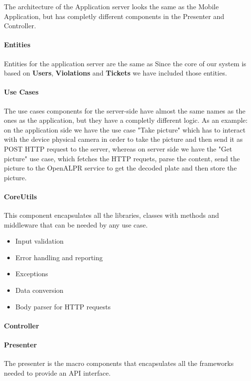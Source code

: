 The architecture of the Application server looks the same as the Mobile Application, but has completly different components in the Presenter and Controller.


\paragraph{Entities}
Entities for the application server are the same as
Since the core of our system is based on \textbf{Users}, \textbf{Violations} and \textbf{Tickets} we have included those entities.


\paragraph{Use Cases}
The use cases components for the server-side have almost the same names as the ones as the application, but they have a completly different logic.
As an example: on the application side we have the use case "Take picture" which has to interact with the device physical camera in order to take the picture and then send it as POST HTTP request to the server, whereas on server side we have the "Get picture" use case, which fetches the HTTP requets, parse the content, send the picture to the OpenALPR service to get the decoded plate and then store the picture.



\paragraph{CoreUtils}
This component encapsulates all the libraries, classes with methods and middleware that can be needed by any use case.
\begin{itemize}
  \item Input validation
  \item Error handling and reporting
  \item Exceptions
  \item Data conversion
  \item Body parser for HTTP requests
\end{itemize}



\paragraph{Controller}


\paragraph{Presenter}
The presenter is the macro components that encapsulates all the frameworks needed to provide an API interface.




